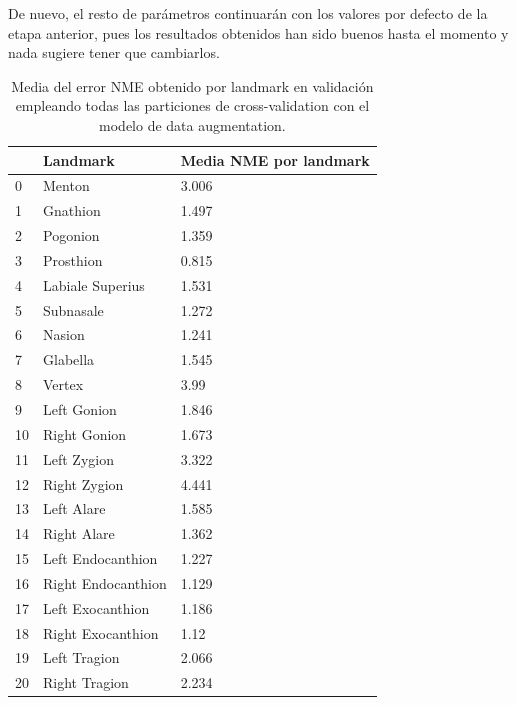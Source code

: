         \medskip

        \noindent De nuevo, el resto de parámetros continuarán con los valores por defecto de la etapa anterior, pues los resultados obtenidos han sido buenos hasta el momento y nada sugiere tener que cambiarlos.

        \begin{table}[!ht]
            \centering
            \caption{Media del error NME obtenido por landmark en validación empleando todas las particiones de cross-validation con el modelo de data augmentation.}
            \begin{tabular}{|l|l|l|}
            \hline
                ~ & Landmark & Media NME por landmark \\ \hline
                0 & Menton & 3.006 \\ \hline
                1 & Gnathion & 1.497 \\ \hline
                2 & Pogonion & 1.359 \\ \hline
                3 & Prosthion & 0.815 \\ \hline
                4 & Labiale Superius & 1.531 \\ \hline
                5 & Subnasale & 1.272 \\ \hline
                6 & Nasion & 1.241 \\ \hline
                7 & Glabella & 1.545 \\ \hline
                8 & Vertex & 3.99 \\ \hline
                9 & Left Gonion & 1.846 \\ \hline
                10 & Right Gonion & 1.673 \\ \hline
                11 & Left Zygion & 3.322 \\ \hline
                12 & Right Zygion & 4.441 \\ \hline
                13 & Left Alare & 1.585 \\ \hline
                14 & Right Alare & 1.362 \\ \hline
                15 & Left Endocanthion & 1.227 \\ \hline
                16 & Right Endocanthion & 1.129 \\ \hline
                17 & Left Exocanthion & 1.186 \\ \hline
                18 & Right Exocanthion & 1.12 \\ \hline
                19 & Left Tragion & 2.066 \\ \hline
                20 & Right Tragion & 2.234 \\ \hline

\end{tabular}
\end{table}

